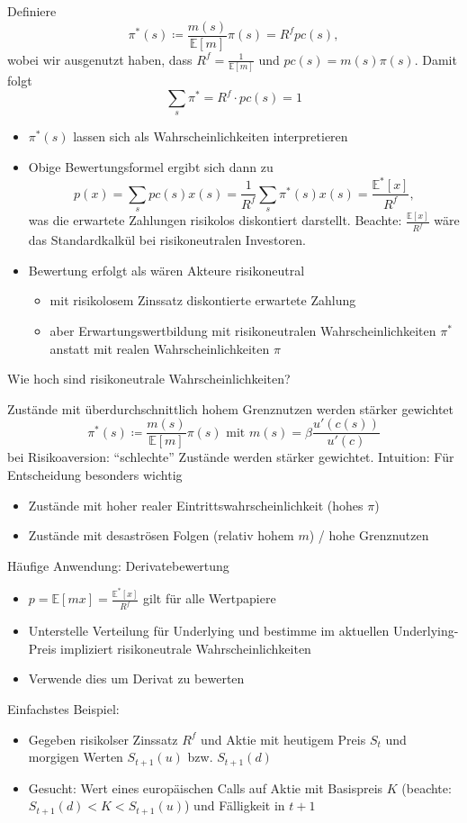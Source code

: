 \documentclass[12pt]{extreport} %
\theoremstyle{named}
\theoremstyle{nnamed}
\theoremstyle{itshape}
\theoremstyle{normal}
\begin{document}
Definiere
	$$ \pi^*(s) \coloneqq \frac{m(s)}{\mathbb{E}[m]} \pi(s) = R^f pc(s), $$
wobei wir ausgenutzt haben, dass $R^f = \frac{1}{\mathbb{E}[m]}$ und $pc(s) = m(s)\pi(s)$. Damit folgt
	$$ \sum_s \pi^* = R^f \cdot pc(s) = 1 $$
	
\begin{itemize}
	\item $\pi^*(s)$ lassen sich als Wahrscheinlichkeiten interpretieren
	\item Obige Bewertungsformel ergibt sich dann zu
		$$ p(x) = \sum_s pc(s) x(s) = \frac{1}{R^f} \sum_s \pi^*(s) x(s) = \frac{\mathbb{E}^*[x]}{R^f}, $$
		was die erwartete Zahlungen risikolos diskontiert darstellt. Beachte: $\frac{\mathbb{E}[x]}{R^f}$ wäre das Standardkalkül bei risikoneutralen Investoren.
	\item Bewertung erfolgt als wären Akteure risikoneutral
		\begin{itemize}
			\item mit risikolosem Zinssatz diskontierte erwartete Zahlung
			\item aber Erwartungswertbildung mit risikoneutralen Wahrscheinlichkeiten $\pi^*$ anstatt mit realen Wahrscheinlichkeiten $\pi$
		\end{itemize}
\end{itemize}

Wie hoch sind risikoneutrale Wahrscheinlichkeiten?

Zustände mit überdurchschnittlich hohem Grenznutzen werden stärker gewichtet
	$$	\pi^*(s) \coloneqq \frac{m(s)}{\mathbb{E}[m]}\pi(s) \text{ mit } m(s) = \beta \frac{u'(c(s))}{u'(c)}	$$
	bei Risikoaversion: \enquote{schlechte} Zustände werden stärker gewichtet. Intuition: Für Entscheidung besonders wichtig
	\begin{itemize}
		\item Zustände mit hoher realer Eintrittswahrscheinlichkeit (hohes $\pi$)
		\item Zustände mit desaströsen Folgen (relativ hohem $m$) / hohe Grenznutzen
	\end{itemize}

Häufige Anwendung: Derivatebewertung 
\begin{itemize}
	\item $p = \mathbb{E}[mx] = \frac{\mathbb{E}^*[x]}{R^f}$ gilt für alle Wertpapiere
	\item Unterstelle Verteilung für Underlying und bestimme im aktuellen Underlying-Preis impliziert risikoneutrale Wahrscheinlichkeiten
	\item Verwende dies um Derivat zu bewerten
\end{itemize}
Einfachstes Beispiel:
\begin{itemize}
	\item Gegeben risikolser Zinssatz $R^f$ und Aktie mit heutigem Preis $S_t$ und morgigen Werten $S_{t+1}(u)$ bzw. $S_{t+1}(d)$
	\item Gesucht: Wert eines europäischen Calls auf Aktie mit Basispreis $K$ (beachte: $S_{t+1}(d) < K < S_{t+1}(u)$) und Fälligkeit in $t+1$
\end{itemize}
\end{document}
